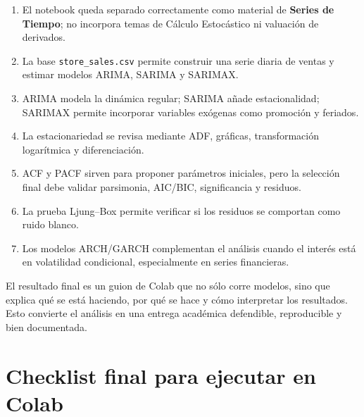 \documentclass[11pt,letterpaper]{article}
\newcommand{\code}[1]{\texttt{#1}}
\begin{document}
\begin{enumerate}[label=\arabic*.]
    \item El notebook queda separado correctamente como material de \textbf{Series de Tiempo}; no incorpora temas de Cálculo Estocástico ni valuación de derivados.
    \item La base \code{store\_sales.csv} permite construir una serie diaria de ventas y estimar modelos ARIMA, SARIMA y SARIMAX.
    \item ARIMA modela la dinámica regular; SARIMA añade estacionalidad; SARIMAX permite incorporar variables exógenas como promoción y feriados.
    \item La estacionariedad se revisa mediante ADF, gráficas, transformación logarítmica y diferenciación.
    \item ACF y PACF sirven para proponer parámetros iniciales, pero la selección final debe validar parsimonia, AIC/BIC, significancia y residuos.
    \item La prueba Ljung--Box permite verificar si los residuos se comportan como ruido blanco.
    \item Los modelos ARCH/GARCH complementan el análisis cuando el interés está en volatilidad condicional, especialmente en series financieras.
\end{enumerate}

\begin{interpretacion}
El resultado final es un guion de Colab que no sólo corre modelos, sino que explica qué se está haciendo, por qué se hace y cómo interpretar los resultados. Esto convierte el análisis en una entrega académica defendible, reproducible y bien documentada.
\end{interpretacion}

\section{Checklist final para ejecutar en Colab}
\end{document}
